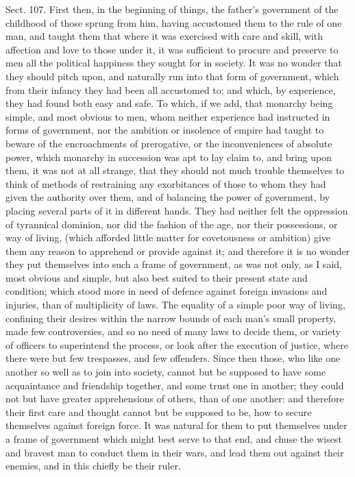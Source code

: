 \documentclass[11pt,openany]{book}
\begin{document}
Sect. 107. First then, in the beginning of things, the father's government of the childhood of those sprung from him, having accustomed them to the rule of one man, and taught them that where it was exercised with care and skill, with affection and love to those under it, it was sufficient to procure and preserve to men all the political happiness they sought for in society. It was no wonder that they should pitch upon, and naturally run into that form of government, which from their infancy they had been all accustomed to; and which, by experience, they had found both easy and safe. To which, if we add, that monarchy being simple, and most obvious to men, whom neither experience had instructed in forms of government, nor the ambition or insolence of empire had taught to beware of the encroachments of prerogative, or the inconveniences of absolute power, which monarchy in succession was apt to lay claim to, and bring upon them, it was not at all strange, that they should not much trouble themselves to think of methods of restraining any exorbitances of those to whom they had given the authority over them, and of balancing the power of government, by placing several parts of it in different hands. They had neither felt the oppression of tyrannical dominion, nor did the fashion of the age, nor their possessions, or way of living, (which afforded little matter for covetousness or ambition) give them any reason to apprehend or provide against it; and therefore it is no wonder they put themselves into such a frame of government, as was not only, as I said, most obvious and simple, but also best suited to their present state and condition; which stood more in need of defence against foreign invasions and injuries, than of multiplicity of laws. The equality of a simple poor way of living, confining their desires within the narrow bounds of each man's small property, made few controversies, and so no need of many laws to decide them, or variety of officers to superintend the process, or look after the execution of justice, where there were but few trespasses, and few offenders. Since then those, who like one another so well as to join into society, cannot but be supposed to have some acquaintance and friendship together, and some trust one in another; they could not but have greater apprehensions of others, than of one another: and therefore their first care and thought cannot but be supposed to be, how to secure themselves against foreign force. It was natural for them to put themselves under a frame of government which might best serve to that end, and chuse the wisest and bravest man to conduct them in their wars, and lead them out against their enemies, and in this chiefly be their ruler.
\end{document}
